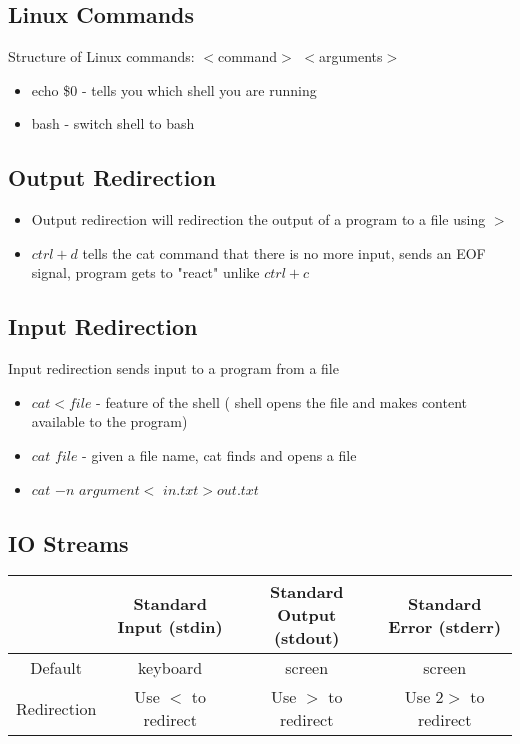 \documentclass[12pt]{article}
\begin{document}
\subsection{Linux Commands}
Structure of Linux commands: $<$command$>$ $<$arguments$>$
\begin{itemize}
    \item echo \$0 - tells you which shell you are running
    \item bash - switch shell to bash
\end{itemize}

\subsection{Output Redirection}
\begin{itemize}
    \item Output redirection will redirection the output of a program to a file using $>$
    \item $ctrl + d$ tells the cat command that there is no more input, sends an EOF signal, program gets to "react" unlike $ctrl + c$
\end{itemize}

\subsection{Input Redirection}
Input redirection sends input to a program from a file
\begin{itemize}
    \item $cat < file$ - feature of the shell ( shell opens the file and makes content available to the program)
    \item $cat$ $file$ - given a file name, cat finds and opens a file
    \item $cat$ $-n$ $argument <$ $in.txt > out.txt$
\end{itemize}

\subsection{IO Streams}
\begin{tabular}{c|c|c|c}
     & Standard Input (stdin) & Standard Output (stdout) & Standard Error (stderr) \\\hline
     Default & keyboard & screen & screen\\
     Redirection & Use $<$ to redirect & Use $>$ to redirect & Use 2$>$ to redirect
\end{tabular}
\end{document}
